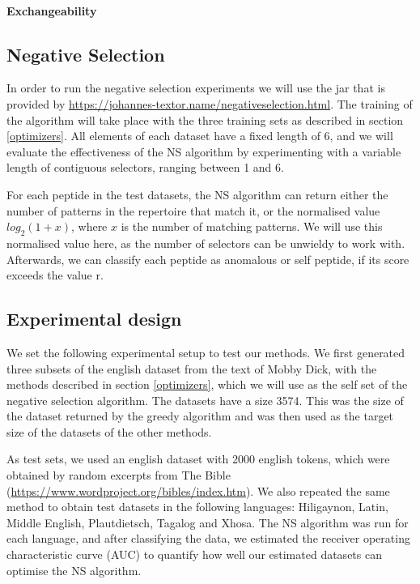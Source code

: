 \documentclass{article}
\begin{document}
\paragraph{Exchangeability}


\subsection{Negative Selection}
In order to run the negative selection experiments we will use the jar that is provided by \url{https://johannes-textor.name/negativeselection.html}.
The training of the algorithm will take place with the three training sets as described in section \ref{optimizers}.
All elements of each dataset have a fixed length of 6, and we will evaluate the effectiveness of the NS algorithm by 
experimenting  with a variable length of contiguous selectors, ranging between 1 and 6. 

For each peptide in the test datasets, the NS algorithm can return either the number of patterns in the repertoire that 
match it, or the normalised value $log_2(1 + x)$, where $x$ is the number of matching patterns. We will use this 
normalised value here, as the number of selectors can be unwieldy to work with. Afterwards, we can classify each peptide 
as anomalous or self peptide, if its score exceeds the value r.

\subsection{Experimental design}
We set the following experimental setup to test our methods. We first generated three subsets of the english dataset 
from the text of Mobby Dick, with the methods described in section \ref{optimizers}, which we will use as the self set of 
the negative selection algorithm. The datasets have a size 3574. This was the size of the dataset returned by the greedy 
algorithm and was then used as the target size of the datasets of the other methods.

As test sets, we used an english dataset with 2000 english tokens, which were obtained by random excerpts from The Bible (\url{https://www.wordproject.org/bibles/index.htm}).
We also repeated the same method to obtain test datasets in the following languages: Hiligaynon, Latin, Middle English, 
Plautdietsch, Tagalog and Xhosa. The NS algorithm was run for each language, and after classifying the data, we 
estimated the receiver operating characteristic curve (AUC) to quantify how well our estimated datasets can optimise 
the NS algorithm.
\end{document}
